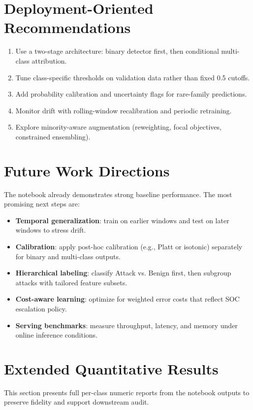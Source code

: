 \documentclass[10pt,journal]{IEEEtran}
\begin{document}
\section{Deployment-Oriented Recommendations}
\begin{enumerate}
\item Use a two-stage architecture: binary detector first, then conditional multi-class attribution.
\item Tune class-specific thresholds on validation data rather than fixed 0.5 cutoffs.
\item Add probability calibration and uncertainty flags for rare-family predictions.
\item Monitor drift with rolling-window recalibration and periodic retraining.
\item Explore minority-aware augmentation (reweighting, focal objectives, constrained ensembling).
\end{enumerate}

\section{Future Work Directions}
The notebook already demonstrates strong baseline performance. The most promising next steps are:
\begin{itemize}
\item \textbf{Temporal generalization}: train on earlier windows and test on later windows to stress drift.
\item \textbf{Calibration}: apply post-hoc calibration (e.g., Platt or isotonic) separately for binary and multi-class outputs.
\item \textbf{Hierarchical labeling}: classify Attack vs. Benign first, then subgroup attacks with tailored feature subsets.
\item \textbf{Cost-aware learning}: optimize for weighted error costs that reflect SOC escalation policy.
\item \textbf{Serving benchmarks}: measure throughput, latency, and memory under online inference conditions.
\end{itemize}

\section{Extended Quantitative Results}
This section presents full per-class numeric reports from the notebook outputs to preserve fidelity and support downstream audit.
\end{document}
